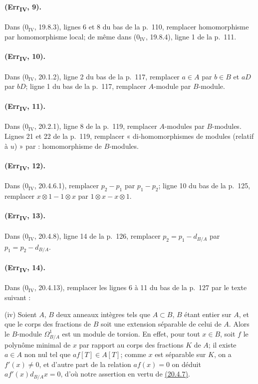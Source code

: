 \paragraph{(Err\textsubscript{IV}, 9).}
Dans ($0_{\mathrm{IV}}$, 19.8.3), lignes 6 et 8 du bas de la p.~110,
remplacer homomorphisme par homomorphisme local; de même dans
($0_{\mathrm{IV}}$, 19.8.4), ligne 1 de la p.~111.

\paragraph{(Err\textsubscript{IV}, 10).}
Dans ($0_{\mathrm{IV}}$, 20.1.2), ligne 2 du bas de la p.~117,
remplacer $a\in A$ par $b\in B$ et $aD$ par $bD$; ligne 1 du bas de la
p.~117, remplacer $A$-module par $B$-module.

\paragraph{(Err\textsubscript{IV}, 11).}
Dans ($0_{\mathrm{IV}}$, 20.2.1), ligne 8 de la p.~119, remplacer
$A$-modules par $B$-modules. Lignes 21 et 22 de la p.~119, remplacer
« di-homomorphismes de modules (relatif à $u$) » par : homomorphisme
de $B$-modules.

\paragraph{(Err\textsubscript{IV}, 12).}
Dans ($0_{\mathrm{IV}}$, 20.4.6.1), remplacer $p_2-p_1$ par $p_1-p_2$;
ligne 10 du bas de la p.~125, remplacer $x\otimes1-1\otimes x$ par
$1\otimes x-x\otimes1$.

\paragraph{(Err\textsubscript{IV}, 13).}
Dans ($0_{\mathrm{IV}}$, 20.4.8), ligne 14 de la p.~126, remplacer
$p_2=p_1-d_{B/A}$ par $p_1=p_2-d_{B/A}$.

\paragraph{(Err\textsubscript{IV}, 14).}
Dans ($0_{\mathrm{IV}}$, 20.4.13), remplacer les lignes 6 à 11 du bas
de la p.~127 par le texte suivant :

\medskip
\noindent
(iv) Soient $A$, $B$ deux anneaux intègres tels que $A\subset B$, $B$
étant entier sur $A$, et que le corps des fractions de $B$ soit une
extension séparable de celui de $A$. Alors le $B$-module
$\Omega^1_{B/A}$ est un module de torsion. En effet, pour tout $x\in B$,
soit $f$ le polynôme minimal de $x$ par rapport au corps des fractions
$K$ de $A$; il existe $a\in A$ non nul tel que $af[T]\in A[T]$; comme
$x$ est séparable sur $K$, on a $f'(x)\neq0$, et d'autre part de la
relation $af(x)=0$ on déduit $af'(x)d_{B/A}x=0$, d'où notre assertion
en vertu de {\hyperlink{ega4.c04.cor.20-4-7}{(20.4.7)}}.

